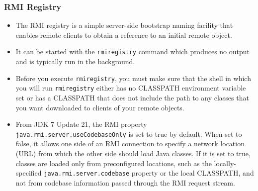 \documentclass[10pt,xcolor=pdflatex]{beamer}
\begin{document}
\begin{frame}[containsverbatim]\frametitle{RMI Registry}
\begin{itemize}
  \item The RMI registry is a simple server-side bootstrap naming facility that enables remote clients to obtain a reference to an initial remote object. 
  \item It can be started with the \texttt{rmiregistry} command which produces no output and is typically run in the background.
  \item Before you execute \texttt{rmiregistry}, you must make sure that the shell in which you will run \texttt{rmiregistry} either has no CLASSPATH environment variable set or has a CLASSPATH that does not include the path to any classes that you want downloaded to clients of your remote objects.
  \item From JDK 7 Update 21, the RMI property \texttt{java.rmi.server.useCodebaseOnly} is set to true by default. When set to false, it allows one side of an RMI connection to specify a network location (URL) from which the other side should load Java classes. If it is set to true, classes are loaded only from preconfigured locations, such as the locally-specified \texttt{java.rmi.server.codebase} property or the local CLASSPATH, and not from codebase information passed through the RMI request stream.
\end{itemize}
\end{frame}
\end{document}
